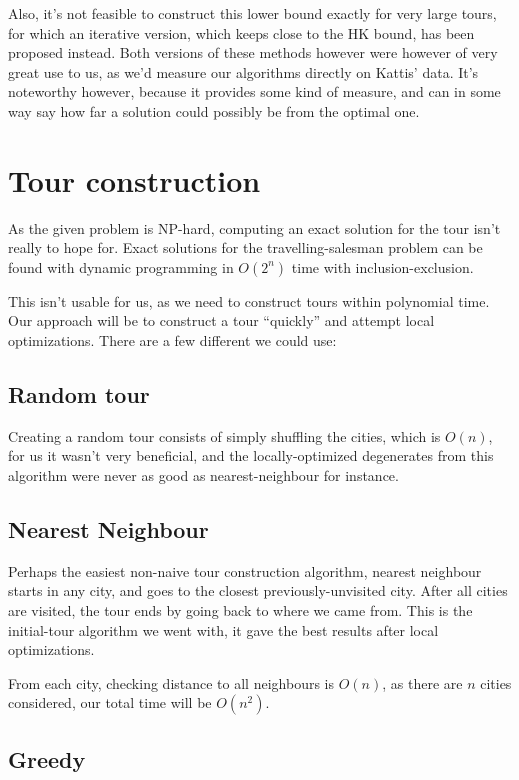 \documentclass[a4paper,12pt,oneside]{article}
\begin{document}
Also, it's not feasible to construct this lower bound exactly for very large tours, for which an iterative version, which keeps close to the HK bound, has been proposed instead. Both versions of these methods however were however of very great use to us, as we'd measure our algorithms directly on Kattis' data. It's noteworthy however, because it provides some kind of measure, and can in some way say how far a solution could possibly be from the optimal one.

\section{Tour construction}

As the given problem is NP-hard, computing an exact solution for the tour isn't really to hope for. Exact solutions for the travelling-salesman problem can be found with dynamic programming in $O(2^n)$ time with inclusion-exclusion\cite{exact}.

This isn't usable for us, as we need to construct tours within polynomial time. Our approach will be to construct a tour ``quickly'' and attempt local optimizations. There are a few different we could use:

\subsection{Random tour}

Creating a random tour consists of simply shuffling the cities, which is $O(n)$, for us it wasn't very beneficial, and the locally-optimized degenerates from this algorithm were never as good as nearest-neighbour for instance. 

\subsection{Nearest Neighbour}

Perhaps the easiest non-naive tour construction algorithm, nearest neighbour starts in any city, and goes to the closest previously-unvisited city. After all cities are visited, the tour ends by going back to where we came from. This is the initial-tour algorithm we went with, it gave the best results after local optimizations.

From each city, checking distance to all neighbours is $O(n)$, as there are $n$ cities considered, our total time will be $O(n^2)$.

\subsection{Greedy}
\end{document}
